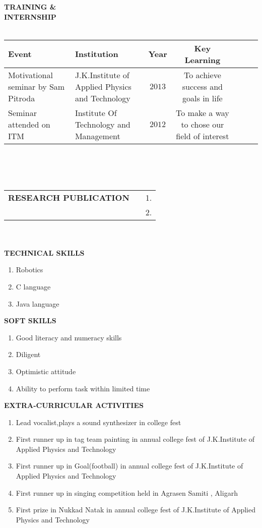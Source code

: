 \documentclass[10pt]{article}
\begin{document}
		\textbf{TRAINING \& \\ INTERNSHIP}\\ \\
		\begin{tabular}{|p{1in}|p{2in}|c|c|p{1in}|c|l|}
			\hline
			\textbf{Event} & \textbf{Institution} & \textbf{Year} & \textbf{Key Learning}\\
			\hline 
			Motivational seminar by Sam Pitroda & J.K.Institute of Applied Physics and Technology & $2013$ & To achieve success and goals in life\\
			Seminar attended on ITM & Institute Of Technology and Management & $2012$ & To make a way to chose our field of interest\\
			\hline
		\end{tabular} \\ \\ \\
		\begin{tabular}{l c l}
			\textbf{RESEARCH PUBLICATION} & &  1.\\
			& &  2.
		\end{tabular}\\ \\
		\textbf{TECHNICAL SKILLS}\\ 
		\begin{enumerate}
			\item Robotics
			\item C language 
			\item Java language
		\end{enumerate} 
		\textbf{SOFT SKILLS}\\
		\begin{enumerate}
			\item Good literacy and numeracy skills
			\item Diligent
			\item Optimistic attitude
			\item Ability to perform task within limited time 
		\end{enumerate} 
		\textbf{EXTRA-CURRICULAR ACTIVITIES}\\
		\begin{enumerate}
			\item Lead vocalist,plays a sound synthesizer in college fest
			\item First runner up in tag team painting in annual college fest of J.K.Institute of Applied Physics and Technology
			\item First runner up in Goal(football) in annual college fest of J.K.Institute of Applied Physics and Technology
			\item First runner up in singing competition held in Agrasen Samiti , Aligarh
			\item First prize in Nukkad Natak in annual college fest of J.K.Institute of Applied Physics and Technology
		\end{enumerate}
\end{document}
